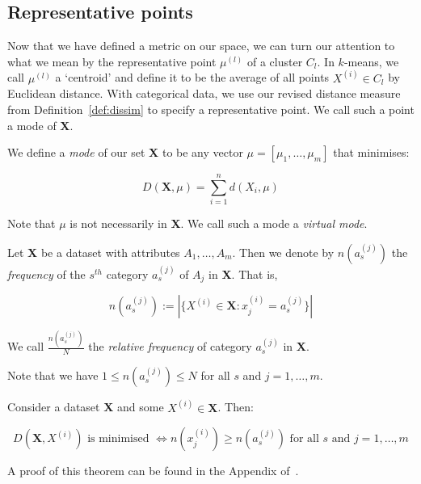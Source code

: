 \subsection{Representative points}\label{subsection:rep-points}

Now that we have defined a metric on our space, we can turn our attention to 
what we mean by the representative point \(\mu^{(l)}\) of a cluster \(C_l\). In 
\(k\)-means, we call \(\mu^{(l)}\) a `centroid' and define it to be the average 
of all points \(X^{(i)} \in C_l\) by Euclidean distance. With categorical data, 
we use our revised distance measure from Definition~\ref{def:dissim} to specify 
a representative point. We call such a point a mode of \textbf{X}.\\

\begin{definition}\label{def:mode}
    We define a \emph{mode} of our set \textbf{X} to be any vector \(\mu = 
    [\mu_1, \ldots, \mu_m]\) that minimises:
	
    \begin{equation}
		D(\textbf{X}, \mu) = \sum_{i=1}^{n} d(X_i, \mu)
	\end{equation}
	
    Note that \(\mu\) is not necessarily in \textbf{X}. We call such a mode a 
    \emph{virtual mode}.
\end{definition}

\begin{definition}\label{def:rel-freq}
    Let \textbf{X} be a dataset with attributes \(A_1, \ldots, A_m\). Then we
    denote by \(n(a_s^{(j)})\) the \emph{frequency} of the \(s^{th}\) category 
    \(a_s^{(j)}\) of \(A_j\) in \textbf{X}. That is, 
	
    \[
	    n(a_s^{(j)}) := |{\{X^{(i)} \in \textbf{X}: x_j^{(i)} = a_s^{(j)}\}}|
	\]
	
    We call \(\frac{n(a_s^{(j)})}{N}\) the \emph{relative frequency} of category 
    \(a_s^{(j)}\) in \textbf{X}.
\end{definition}

\begin{remark}
    Note that we have \(1 \le n(a_s^{(j)}) \le N\) for all \(s\) and \(j = 1, 
    \ldots, m\).\\
\end{remark}

\begin{theorem}\label{theorem:1}
    Consider a dataset \textbf{X} and some \(X^{(i)} \in \textbf{X}\). Then:
	
    \[
	    D(\textbf{X}, X^{(i)}) \text{ is minimised } \iff n(x_j^{(i)}) \geq 
	    n(a_s^{(j)}) \text{ for all } s \text{ and } j = 1, \ldots, m 
	\]
\end{theorem}
A proof of this theorem can be found in the Appendix of~\cite{Huang98}.\\


